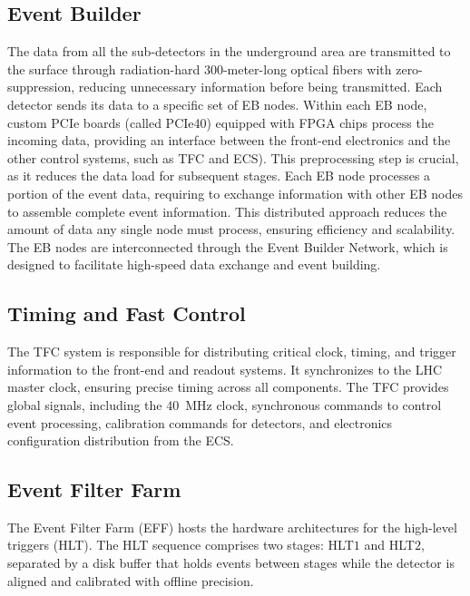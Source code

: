 \subsection{Event Builder}
The data from all the sub-detectors in the underground area are transmitted to the surface through radiation-hard 300-meter-long optical fibers with zero-suppression, reducing unnecessary information before being transmitted. Each detector sends its data to a specific set of EB nodes. Within each EB node, custom PCIe boards (called PCIe40) equipped with FPGA chips process the incoming data, providing an interface between the front-end electronics and the other control systems, such as TFC and ECS). This preprocessing step is crucial, as it reduces the data load for subsequent stages. Each EB node processes a portion of the event data, requiring to exchange information with other EB nodes to assemble complete event information. This distributed approach reduces the amount of data any single node must process, ensuring efficiency and scalability. The EB nodes are interconnected through the Event Builder Network, which is designed to facilitate high-speed data exchange and event building.




\subsection{Timing and Fast Control}
The TFC system is responsible for distributing critical clock, timing, and trigger information to the front-end and readout systems. It synchronizes to the LHC master clock, ensuring precise timing across all components. The TFC provides global signals, including the \SI{40}{\mega\hertz} clock, synchronous commands to control event processing, calibration commands for detectors, and electronics configuration distribution from the ECS.

\subsection{Event Filter Farm}
The Event Filter Farm (EFF) hosts the hardware architectures for the high-level triggers (HLT). The HLT sequence comprises two stages: HLT$1$ and HLT$2$, separated by a disk buffer that holds events between stages while the detector is aligned and calibrated with offline precision.
